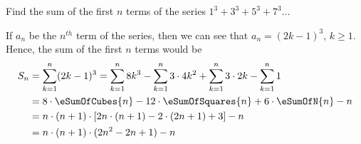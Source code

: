 
%
%
%
%
% 
% 

\question[3] Find the sum of the first $n$ terms of the series $1^3 + 3^3 + 5^3 + 7^3 \ldots$ 


\ifprintanswers
\fi 

\begin{solution}[\halfpage]
	If $a_n$ be the $n^{th}$ term of the series, then we can see that $a_n = (2k-1)^3,\, k \geq 1$.
	Hence, the sum of the first $n$ terms would be 
	\begin{align}
		S_n &= \sum_{k=1}^{n}(2k-1)^3 = \sum_{k=1}^{n}8k^3 - 
		\sum_{k=1}^{n}3\cdot 4k^2 + \sum_{k=1}^{n}3\cdot 2k - \sum_{k=1}^{n} 1 \\
		&= 8\cdot\eSumOfCubes{n} - 12\cdot\eSumOfSquares{n} + 6\cdot\eSumOfN{n} - n \\
		&= n\cdot(n+1)\cdot[2n\cdot(n+1) - 2\cdot(2n+1) + 3 ] - n \\
		&= n\cdot(n+1)\cdot(2n^2-2n+1) - n
	\end{align}
\end{solution}
 

